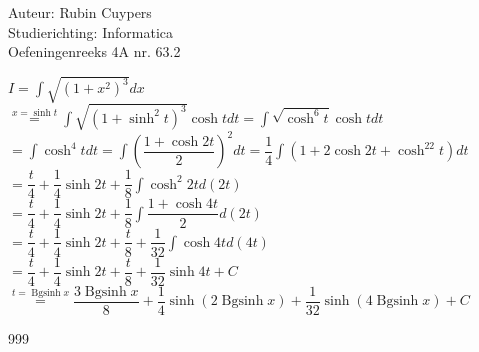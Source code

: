 \documentclass[a4paper]{article}
\newcommand{\dint}{\displaystyle \int}
\begin{document}
  
\noindent \large Auteur: Rubin Cuypers \\
\noindent \large Studierichting: Informatica\\
\noindent \large Oefeningenreeks 4A nr. 63.2\\

\medskip

\normalsize

$I=\dint \sqrt{\left(1+x^2\right)^3} dx$\\

$\overset{x=\sinh t}{=} \dint \sqrt{\left(1+\sinh^2 t\right)^3 }\cosh t  dt =\dint \sqrt{\cosh^6t} \cosh t dt $\\

$=\dint \cosh^4 t dt=\dint \left(\dfrac{1+\cosh 2t}{2}\right)^2dt=\dfrac{1}{4}\dint \left(1+2\cosh 2t + \cosh^22t\right) dt$\\

$=\dfrac{t}{4} +\dfrac{1}{4}\sinh 2t +\dfrac{1}{8}\dint \cosh^2 2t d(2t) $\\ 

$=\dfrac{t}{4} +\dfrac{1}{4}\sinh 2t + \dfrac{1}{8} \dint \dfrac{1+\cosh 4t}{2} d(2t)$\\

$=\dfrac{t}{4} +\dfrac{1}{4}\sinh 2t + \dfrac{t}{8} +\dfrac{1}{32}\dint \cosh 4t d(4t) $\\

$=\dfrac{t}{4} +\dfrac{1}{4}\sinh 2t + \dfrac{t}{8} +\dfrac{1}{32}\sinh 4t +C$\\

$\overset{t=\operatorname{Bgsinh} x}{=} \dfrac{3\operatorname{Bgsinh} x}{8} + \dfrac{1}{4} \sinh \left(2\operatorname{Bgsinh} x\right) + \dfrac{1}{32} \sinh \left(4\operatorname{Bgsinh} x\right)  + C$\\


\begin{thebibliography}{999}
\end{thebibliography}
\end{document}
